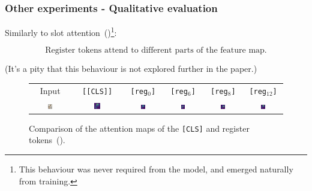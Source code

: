 \documentclass[aspectratio=169]{beamer}
\begin{document}
\begin{frame}
\frametitle{Other experiments - Qualitative evaluation}

Similarly to slot attention~(\cite{locatelloObjectCentricLearningSlot2020})\footnote{This behaviour was never required from the model, and emerged naturally from training.}:

$$
\boxed{\text{Register tokens attend to different parts of the feature map.}}
$$

{\footnotesize
(It's a pity that this behaviour is not explored further in the paper.)
}

\begin{figure}[t]
    \begin{tabular}{cccccc}
      Input & \texttt{[\texttt{[CLS]}]} & \texttt{[reg$_0$]} & \texttt{[reg$_6$]} & \texttt{[reg$_8$]} & \texttt{[reg$_{12}$]} \\
      \includegraphics[width=0.13\textwidth]{resources/230913_fig_slot_attn/mug.png} &
      \includegraphics[width=0.13\textwidth]{resources/230913_fig_slot_attn/mug_attn_cls.png} &
      \includegraphics[width=0.13\textwidth]{resources/230913_fig_slot_attn/mug_attn_reg_0.png} &
      \includegraphics[width=0.13\textwidth]{resources/230913_fig_slot_attn/mug_attn_reg_6.png} &
      \includegraphics[width=0.13\textwidth]{resources/230913_fig_slot_attn/mug_attn_reg_8.png} &
      \includegraphics[width=0.13\textwidth]{resources/230913_fig_slot_attn/mug_attn_reg_12.png}
      \\
    \end{tabular}
    \caption{
      Comparison of the attention maps of the \texttt{[CLS]} and register tokens~(\cite{darcetVisionTransformersNeed2024}).
    }
    \label{fig:slot_attn}
\end{figure}

\end{frame}
\end{document}
